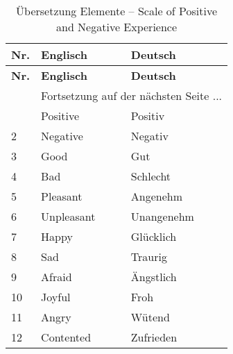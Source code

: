 \begin{RaggedRight}
\begin{center}
    \begin{longtable}[t]{|p{0.8 cm}|p{6.6 cm}|p{6.6 cm}|}
    \caption{Übersetzung Elemente -- Scale of Positive and Negative Experience} \\ \hline
        \textbf{Nr.} & \textbf{Englisch} & \textbf{Deutsch} \\ \hline
        \endfirsthead
        \hline
        \textbf{Nr.} & \textbf{Englisch} & \textbf{Deutsch} \\ \hline
        \endhead 
        & \multicolumn{2}{|c|}{Fortsetzung auf der nächsten Seite $...$ } \\ \hline
        \endfoot
        \hline
        \endlastfoot
        1 & Positive & Positiv\\
        2 & Negative & Negativ\\
        3 & Good & Gut\\
        4 & Bad & Schlecht\\
        5 & Pleasant & Angenehm\\
        6 & Unpleasant & Unangenehm\\
        7 & Happy & Glücklich\\
        8 & Sad & Traurig\\
        9 & Afraid & Ängstlich\\
        10 & Joyful & Froh\\
        11 & Angry & Wütend\\
        12 & Contented & Zufrieden\\  
    \end{longtable}
	\label{tab:SpaneElemente}
\end{center}

\end{RaggedRight}
